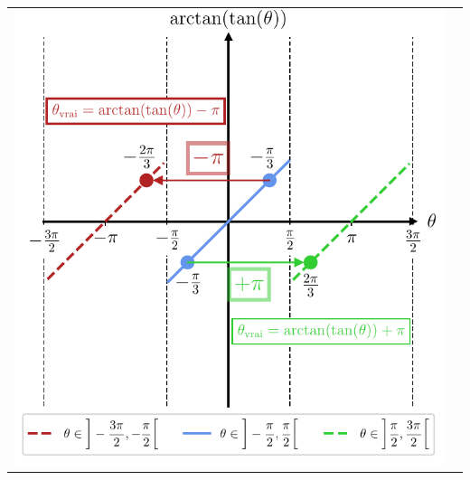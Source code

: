 \documentclass[../../main/main.tex]{subfiles}
\begin{document}
\begin{tcb*}[breakable]
\begin{center}
\begin{tabularx}{\linewidth}{YY}
{					{\includegraphics[width=0.85\linewidth]{fig_atantan_prof}}
				}%
				 &
\end{tabularx}
\end{center}
\end{tcb*}
\end{document}
